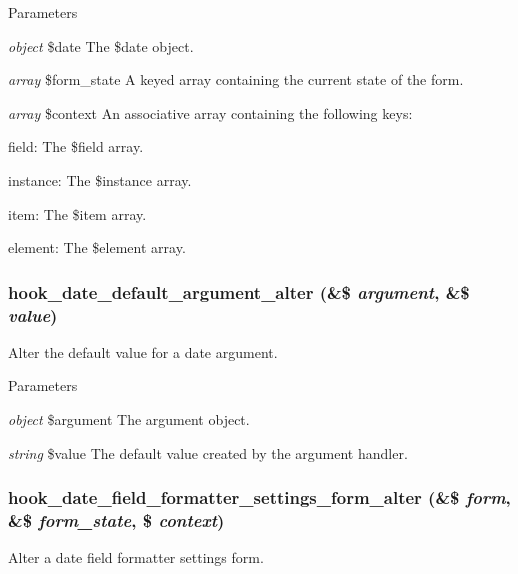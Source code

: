\begin{DoxyParams}{Parameters}
\item[{\em object}]\$date The \$date object. \item[{\em array}]\$form\_\-state A keyed array containing the current state of the form. \item[{\em array}]\$context An associative array containing the following keys:
\begin{DoxyItemize}
\item field: The \$field array.
\item instance: The \$instance array.
\item item: The \$item array.
\item element: The \$element array. 
\end{DoxyItemize}\end{DoxyParams}
\hypertarget{date_8api_8php_a78d7487f22190596ae8d3298ae5426c2}{
\subsubsection[{hook\_\-date\_\-default\_\-argument\_\-alter}]{\setlength{\rightskip}{0pt plus 5cm}hook\_\-date\_\-default\_\-argument\_\-alter (\&\$ {\em argument}, \/  \&\$ {\em value})}}
\label{date_8api_8php_a78d7487f22190596ae8d3298ae5426c2}
Alter the default value for a date argument.


\begin{DoxyParams}{Parameters}
\item[{\em object}]\$argument The argument object. \item[{\em string}]\$value The default value created by the argument handler. \end{DoxyParams}
\hypertarget{date_8api_8php_a8100fc54aa7868fa781c96c8b99f2026}{
\subsubsection[{hook\_\-date\_\-field\_\-formatter\_\-settings\_\-form\_\-alter}]{\setlength{\rightskip}{0pt plus 5cm}hook\_\-date\_\-field\_\-formatter\_\-settings\_\-form\_\-alter (\&\$ {\em form}, \/  \&\$ {\em form\_\-state}, \/  \$ {\em context})}}
\label{date_8api_8php_a8100fc54aa7868fa781c96c8b99f2026}
Alter a date field formatter settings form.


